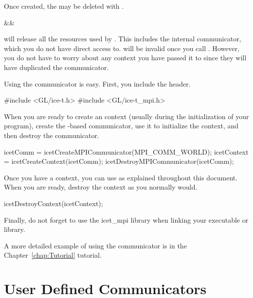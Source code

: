 Once created, the  may be deleted with
.

\begin{Table}{3}
  \textC{(}&&\quad\textC{);}
\end{Table}

 will release all the resources used by
.  This includes the internal \MPI communicator, which you do
not have direct access to.   will be invalid once you call
.  However, you do not have to worry
about any \IceT context you have passed it to since they will have
duplicated the communicator.

Using the \MPI communicator is easy.  First, you include the
 header.

\begin{code}
#include <GL/ice-t.h>
#include <GL/ice-t_mpi.h>
\end{code}

When you are ready to create an \IceT context (usually during the
initialization of your program), create the \MPI-based communicator, use it
to initialize the context, and then destroy the communicator.

\begin{code}
  icetComm = icetCreateMPICommunicator(MPI_COMM_WORLD);
  icetContext = icetCreateContext(icetComm);
  icetDestroyMPICommunicator(icetComm);
\end{code}

Once you have a context, you can use \IceT as explained throughout this
document.  When you are ready, destroy the context as you normally would.

\begin{code}
  icetDestroyContext(icetContext);
\end{code}

Finally, do not forget to use the icet\_mpi
library when linking your executable or library.

A more detailed example of using the \MPI communicator is in the
Chapter~\ref{chap:Tutorial} tutorial.

\section{User Defined Communicators}
\label{sec:Communicators:User_Defined_Communicators}

